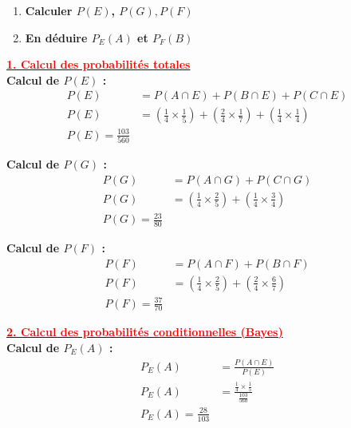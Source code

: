 \documentclass[12pt,a4paper]{article}
\begin{document}
\vspace{1cm}

\begin{enumerate}
    \item \textbf{Calculer $P(E)$, $P(G), P(F)$}
    \item \textbf{En déduire $P_E(A)$ et $P_F(B)$}
\end{enumerate}

\underline{\textbf{\textcolor{red}{ 1. Calcul des probabilités totales }}}\\

\textbf{Calcul de $P(E)$ :}
\begin{align*}
P(E) &= P(A \cap E) + P(B \cap E) + P(C \cap E) \\
P(E) &= \left( \frac{1}{4} \times \frac{1}{5} \right) + \left( \frac{2}{4} \times \frac{1}{7} \right) + \left( \frac{1}{4} \times \frac{1}{4} \right) \\
\boxed{P(E) = \frac{103}{560}}
\end{align*}

\vspace{1em}

\textbf{Calcul de $P(G)$ :}
\begin{align*}
P(G) &= P(A \cap G) + P(C \cap G) \\
P(G) &= \left( \frac{1}{4} \times \frac{2}{5} \right) + \left( \frac{1}{4} \times \frac{3}{4} \right) \\
\boxed{P(G) = \frac{23}{80}}
\end{align*}

\vspace{1em}

\textbf{Calcul de $P(F)$ :}
\begin{align*}
P(F) &= P(A \cap F) + P(B \cap F) \\
P(F) &= \left( \frac{1}{4} \times \frac{2}{5} \right) + \left( \frac{2}{4} \times \frac{6}{7} \right) \\
\boxed{P(F) = \frac{37}{70}}
\end{align*}

\underline{\textbf{\textcolor{red}{ 2. Calcul des probabilités conditionnelles (Bayes) }}}\\


\textbf{Calcul de $P_E(A)$ :}
\begin{align*}
P_E(A) &= \frac{P(A \cap E)}{P(E)} \\
P_E(A) &= \frac{\frac{1}{4} \times \frac{1}{5}}{\frac{103}{560}} \\
\boxed{P_E(A) = \frac{28}{103}}
\end{align*}
\end{document}
